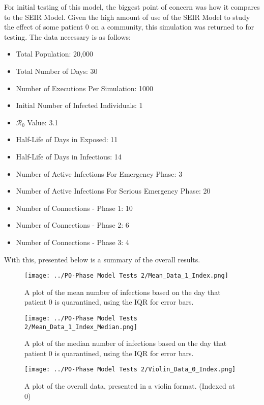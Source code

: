 \documentclass{article}
\numberwithin{equation}{section} %
\begin{document}
\begin{multicols}{2}
  For initial testing of this model, the biggest point of concern was how it compares to the SEIR Model. Given the high amount of use of the SEIR Model to study the effect of some patient 0 on a community, this simulation was returned to for testing. The data necessary is as follows: \\
  \begin{itemize}
  \item Total Population: 20,000 
  \item Total Number of Days: 30
  \item Number of Executions Per Simulation: 1000
  \item Initial Number of Infected Individuals: 1
  \item $\mathcal{R}_0$ Value: 3.1
  \item Half-Life of Days in Exposed: 11
  \item Half-Life of Days in Infectious: 14
  \item Number of Active Infections For Emergency Phase: 3
  \item Number of Active Infections For Serious Emergency Phase: 20
  \item Number of Connections - Phase 1: 10
  \item Number of Connections - Phase 2: 6
  \item Number of Connections - Phase 3: 4
  \end{itemize}
  
  With this, presented below is a summary of the overall results. 
  
\end{multicols}

\begin{figure}[H]
  \centering
  \texttt{[image: ../P0-Phase Model Tests 2/Mean\_Data\_1\_Index.png]}
  \caption{A plot of the mean number of infections based on the day that patient 0 is quarantined, using the IQR for error bars.}
\end{figure}

\begin{figure}[H]
  \centering
  \texttt{[image: ../P0-Phase Model Tests 2/Mean\_Data\_1\_Index\_Median.png]}
  \caption{A plot of the median number of infections based on the day that patient 0 is quarantined, using the IQR for error bars.}
\end{figure}

\begin{figure}[H]
  \centering
  \texttt{[image: ../P0-Phase Model Tests 2/Violin\_Data\_0\_Index.png]}
  \caption{A plot of the overall data, presented in a violin format. (Indexed at 0)}
\end{figure}
\end{document}
